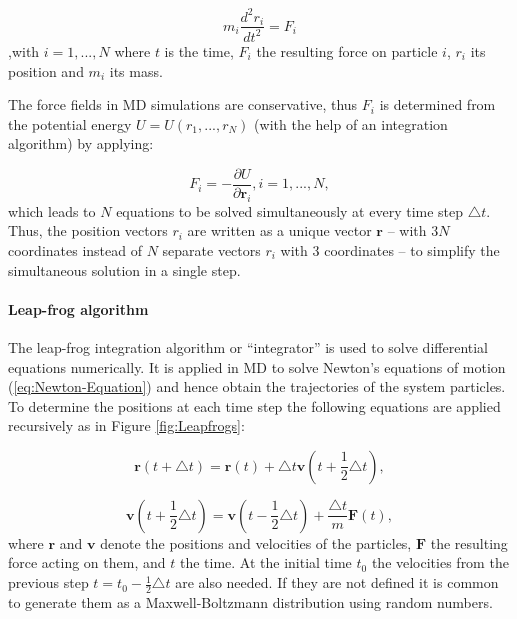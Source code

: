 \begin{equation} \label{eq:Newton-Equation} m_{i}\frac{d^{2} {r}_{i}}{d t^{2}} = {F}_{i} \end{equation},\enspace with $i=1,...,N$ 
where $t$ is the time, ${F}_{i}$ the resulting force on particle
$i$, ${r}_{i}$ its position and $m_{i}$ its mass.

The force fields in MD simulations are conservative, thus ${F}_{i}$
is determined from the potential energy $U=U(r_{1},...,r_{N})$ (with
the help of an integration algorithm) by applying:

\begin{equation}
{F}_{i}=-\frac{\partial U}{\partial\mathbf{r}_{i}}, i=1,...,N,\label{eq:Force-PotEnergy-derivative}
\end{equation}
which leads to $N$ equations to be solved simultaneously at every
time step $\triangle t$. Thus, the position vectors ${r}_{i}$
are written as a unique vector $\mathbf{r}$ -- with $3N$ coordinates
instead of $N$ separate vectors ${r}_{i}$ with 3 coordinates
-- to simplify the simultaneous solution in a single step.

\paragraph{Leap-frog algorithm }

The leap-frog integration algorithm or ``integrator'' is used to
solve differential equations numerically. It is applied in MD to solve
Newton's equations of motion (\ref{eq:Newton-Equation}) and hence
obtain the trajectories of the system particles. To determine the
positions at each time step the following equations are applied recursively
as in Figure \ref{fig:Leapfrogs}:

\begin{equation}
\mathbf{r}(t+\triangle t)=\mathbf{r}(t)+\triangle t\mathbf{v}(t+\frac{1}{2}\triangle t),\label{eq:leapfrog-r}
\end{equation}

\begin{equation}
\mathbf{v}(t+\frac{1}{2}\triangle t)=\mathbf{\mathbf{v}}(t-\frac{1}{2}\triangle t)+\frac{\triangle t}{m}\mathbf{F}(t),\label{eq:leapfrog-v}
\end{equation}
where $\mathbf{r}$ and $\mathbf{v}$ denote the positions and velocities
of the particles, $\mathbf{F}$ the resulting force acting on them,
and $t$ the time. At the initial time $t_{0}$ the velocities from
the previous step $t=t_{0}-\frac{1}{2}\triangle t$ are also needed.
If they are not defined it is common to generate them as a Maxwell-Boltzmann
distribution using random numbers.

